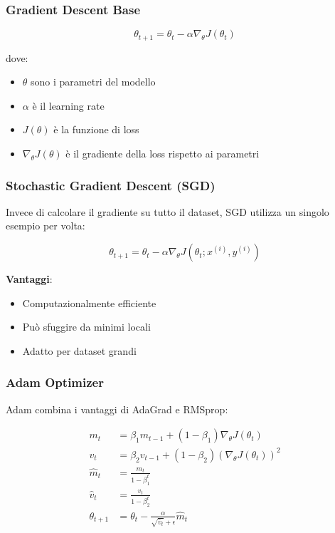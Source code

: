 \documentclass[12pt,a4paper,twoside]{report}
\begin{document}
\subsubsection{Gradient Descent Base}
\begin{equation}
\theta_{t+1} = \theta_t - \alpha \nabla_\theta J(\theta_t)
\end{equation}

dove:
\begin{itemize}
    \item $\theta$ sono i parametri del modello
    \item $\alpha$ è il learning rate
    \item $J(\theta)$ è la funzione di loss
    \item $\nabla_\theta J(\theta)$ è il gradiente della loss rispetto ai parametri
\end{itemize}

\subsubsection{Stochastic Gradient Descent (SGD)}
Invece di calcolare il gradiente su tutto il dataset, SGD utilizza un singolo esempio per volta:

\begin{equation}
\theta_{t+1} = \theta_t - \alpha \nabla_\theta J(\theta_t; x^{(i)}, y^{(i)})
\end{equation}

\textbf{Vantaggi}:
\begin{itemize}
    \item Computazionalmente efficiente
    \item Può sfuggire da minimi locali
    \item Adatto per dataset grandi
\end{itemize}

\subsubsection{Adam Optimizer}
Adam combina i vantaggi di AdaGrad e RMSprop:

\begin{align}
m_t &= \beta_1 m_{t-1} + (1 - \beta_1) \nabla_\theta J(\theta_t) \\
v_t &= \beta_2 v_{t-1} + (1 - \beta_2) (\nabla_\theta J(\theta_t))^2 \\
\hat{m}_t &= \frac{m_t}{1 - \beta_1^t} \\
\hat{v}_t &= \frac{v_t}{1 - \beta_2^t} \\
\theta_{t+1} &= \theta_t - \frac{\alpha}{\sqrt{\hat{v}_t} + \epsilon} \hat{m}_t
\end{align}
\end{document}
